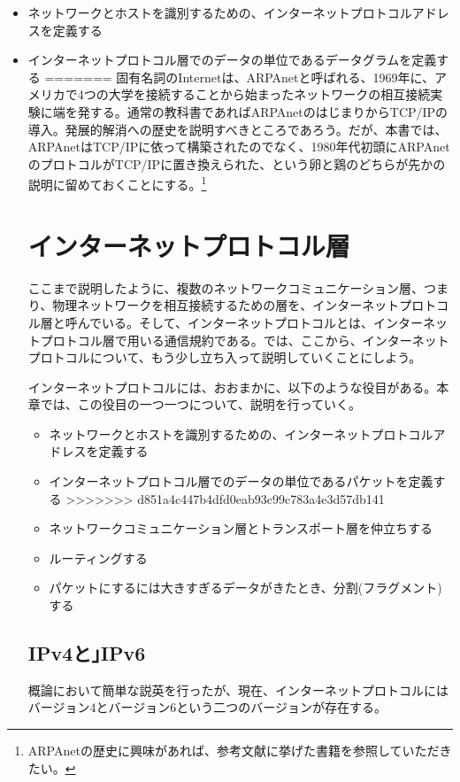 \begin{itemize}
\item ネットワークとホストを識別するための、インターネットプロトコルアドレスを定義する 
\item インターネットプロトコル層でのデータの単位であるデータグラムを定義する 
=======
固有名詞のInternetは、ARPAnetと呼ばれる、1969年に、アメリカで4つの大学を接続することから始まったネットワークの相互接続実験に端を発する。通常の教科書であればARPAnetのはじまりからTCP/IPの導入。発展的解消への歴史を説明すべきところであろう。だが、本書では、ARPAnetはTCP/IPに依って構築されたのでなく、1980年代初頭にARPAnetのプロトコルがTCP/IPに置き換えられた、という卵と鶏のどちらが先かの説明に留めておくことにする。\footnote{ARPAnetの歴史に興味があれば、参考文献に挙げた書籍を参照していただきたい。}




\section{インターネットプロトコル層}

ここまで説明したように、複数のネットワークコミュニケーション層、つまり、物理ネットワークを相互接続するための層を、インターネットプロトコル層と呼んでいる。そして、インターネットプロトコルとは、インターネットプロトコル層で用いる通信規約である。では、ここから、インターネットプロトコルについて、もう少し立ち入って説明していくことにしよう。

インターネットプロトコルには、おおまかに、以下のような役目がある。本章では、この役目の一つ一つについて、説明を行っていく。

\begin{itemize}
\item ネットワークとホストを識別するための、インターネットプロトコルアドレスを定義する 
\item インターネットプロトコル層でのデータの単位であるパケットを定義する 
>>>>>>> d851a4c447b4dfd0eab93c99c783a4e3d57db141
\item ネットワークコミュニケーション層とトランスポート層を仲立ちする 
\item ルーティングする
\item パケットにするには大きすぎるデータがきたとき、分割(フラグメント)する
\end{itemize}

\subsection{IPv4と｣IPv6}
概論において簡単な説英を行ったが、現在、インターネットプロトコルにはバージョン4とバージョン6という二つのバージョンが存在する。


\end{itemize}
